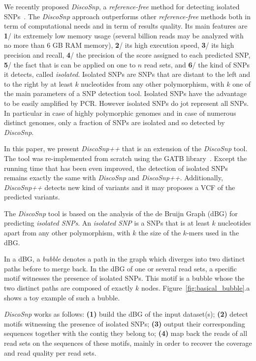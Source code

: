 \documentclass{bmcart}
\newcommand{\disco}{{\it DiscoSnp}\xspace}
\newcommand{\discopp}{{\it DiscoSnp++}\xspace}
\begin{document}
We recently proposed \disco, a \emph{reference-free} method for detecting isolated SNPs~\cite{Uricaru2014a}. The \disco approach outperforms other \emph{reference-free} methods both in term of computational needs and in term of results quality. Its main features are \textbf{1}/ its extremely low memory usage (several billion reads may be analyzed with no more than 6 GB RAM memory), \textbf{2}/ its high execution speed, \textbf{3}/ its high precision and recall, \textbf{4}/ the precision of the score assigned to each predicted SNP, \textbf{5}/ the fact that is can be applied on one to $n$ read sets, and \textbf{6}/ the kind of SNPs it detects, called \emph{isolated}. Isolated SNPs are SNPs that are distant to the left and to the right by at least $k$ nucleotides from any other polymorphism, with $k$ one of the main parameters of a SNP detection tool. Isolated SNPs have the advantage to be easily amplified by PCR. However isolated SNPs do jot represent all SNPs. In particular in case of highly polymorphic genomes and in case of numerous distinct genomes, only a fraction of SNPs are isolated and so detected by \disco.


In this paper, we present \discopp that is an extension of the \disco tool. The tool was re-implemented from scratch using the GATB library~\cite{Drezen2014}. Except the running time that has been even improved, the detection of isolated SNPs remains exactly the same with \disco and \discopp. Additionally, \discopp detects new kind of variants and it may proposes a VCF of the predicted variants.  


The \disco tool is based on the analysis of the de Bruijn Graph (dBG) for predicting \emph{isolated SNPs}. An \emph{isolated SNP} is a SNPs that is at least $k$ nucleotides apart from any other polymorphism, with $k$ the size of the $k$-mers used in the dBG. 

In a dBG, a \emph{bubble} denotes a path in the graph which diverges into two distinct paths before to merge back. In the dBG of one or several read sets, a specific motif witnesses the presence of isolated SNPs. This motif is a bubble whose the two distinct paths are composed of exactly $k$ nodes. Figure~\ref{fig:basical_bubble}.a shows a toy example of such a bubble. 



\disco works as follows: \textbf{(1)} build the dBG of the input dataset(s);  \textbf{(2)} detect motifs witnessing the presence of isolated SNPs; \textbf{(3)} output their corresponding sequences together with the contig they belong to; \textbf{(4)} map back the reads of all read sets on the sequences of these motifs, mainly in order to recover the coverage and read quality per read sets. 
\end{document}
